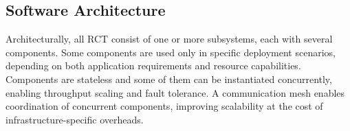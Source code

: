 \documentclass[preprint,12pt, a4paper]{elsarticle}
\begin{document}
\subsection{Software Architecture}\label{ssec:architecture}



Architecturally, all RCT consist of one or more subsystems, each with several
components. %
Some components are used only in specific deployment scenarios, depending on
both application requirements and resource capabilities. Components are
stateless and some of them can be instantiated concurrently, 
enabling throughput scaling and fault tolerance. A communication mesh enables
coordination of concurrent components, improving scalability at the cost of
infrastructure-specific overheads.




\end{document}
